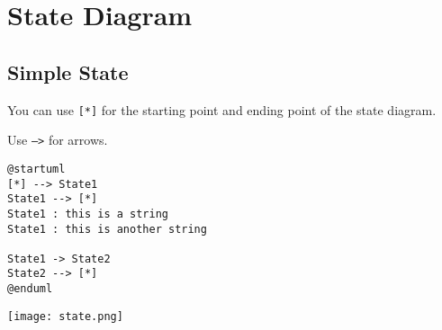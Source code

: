 %
%
% 
%
%
%
%
%
% 

\section{State Diagram}

\subsection{Simple State}

\begin{description}
\item You can use \texttt{[*]} for the starting point and ending point of the
state diagram.
\item Use \texttt{-->} for arrows.
\end{description}

\begin{lstlisting}
@startuml
[*] --> State1
State1 --> [*]
State1 : this is a string
State1 : this is another string

State1 -> State2
State2 --> [*]
@enduml
\end{lstlisting}

\begin{center}
\texttt{[image: state.png]}
\end{center}


